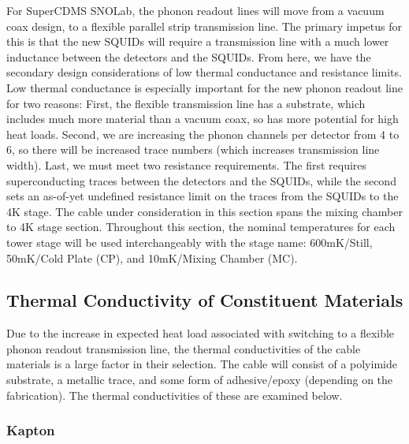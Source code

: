 \documentclass{report}
\begin{document}
For SuperCDMS SNOLab, the phonon readout lines will move from a vacuum coax design, to a flexible parallel strip transmission line. The primary impetus for this is that the new SQUIDs will require a transmission line with a much lower inductance between the detectors and the SQUIDs. From here, we have the secondary design considerations of low thermal conductance and resistance limits. Low thermal conductance is especially important for the new phonon readout line for two reasons: First, the flexible transmission line has a substrate, which includes much more material than a vacuum coax, so has more potential for high heat loads. Second, we are increasing the phonon channels per detector from 4 to 6, so there will be increased trace numbers (which increases transmission line width). Last, we must meet two resistance requirements. The first requires superconducting traces between the detectors and the SQUIDs, while the second sets an as-of-yet undefined resistance limit on the traces from the SQUIDs to the 4K stage. The cable under consideration in this section spans the mixing chamber to 4K stage section. Throughout this section, the nominal temperatures for each tower stage will be used interchangeably with the stage name: 600mK/Still, 50mK/Cold Plate (CP), and 10mK/Mixing Chamber (MC).

\subsection{Thermal Conductivity of Constituent Materials}

Due to the increase in expected heat load associated with switching to a flexible phonon readout transmission line, the thermal conductivities of the cable materials is a large factor in their selection. The cable will consist of a polyimide substrate, a metallic trace, and some form of adhesive/epoxy (depending on the fabrication). The thermal conductivities of these are examined below.

\subsubsection{Kapton}
\end{document}
